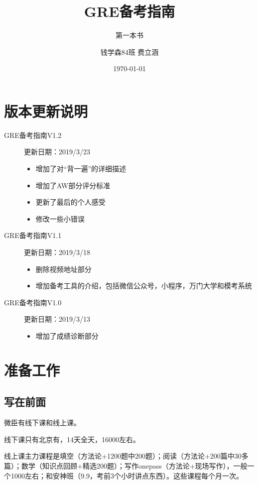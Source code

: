 \documentclass[cn,plain]{elegantbookex}
\title{GRE备考指南}
\subtitle{第一本书}
\author{钱学森84班 费立涵}
\institute{钱学森学院学业辅导中心}
\date{\today}
\begin{document}
\maketitle

\chapter*{版本更新说明}
\begin{description}
    \item[GRE备考指南V1.2] 更新日期：2019/3/23
    \begin{itemize}
        \item 增加了对``背一遍''的详细描述
        \item 增加了AW部分评分标准
        \item 更新了最后的个人感受
        \item 修改一些小错误
    \end{itemize}
    \item[GRE备考指南V1.1] 更新日期：2019/3/18
    \begin{itemize}
        \item 删除视频地址部分
        \item 增加备考工具的介绍，包括微信公众号，小程序，万门大学和模考系统
    \end{itemize}
    \item[GRE备考指南V1.0] 更新日期：2019/3/13
    \begin{itemize}
        \item 增加了成绩诊断部分
    \end{itemize}
\end{description}
\newpage
\thispagestyle{empty}

\tableofcontents

\mainmatter
\hypersetup{pageanchor=true}

\chapter{准备工作}
\section{写在前面}
微臣有线下课和线上课。

线下课只有北京有，14天全天，16000左右。

线上课主力课程是填空（方法论+1200题中200题）；阅读（方法论+200篇中30多篇）；数学（知识点回顾+精选200题）；写作onepass（方法论+现场写作），一般一个1000左右；和安神班（9.9，考前3个小时讲点东西）。这些课程每个月一次。
\end{document}
